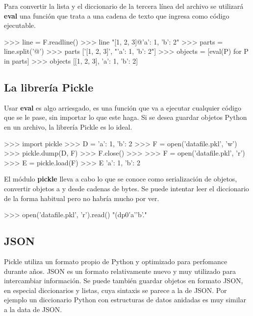 Para convertir la lista y el diccionario de la tercera línea del archivo se utilizará \textbf{eval} una función que trata a una cadena de texto que ingresa como código ejecutable.\\

\begin{pyglist} [language=python]
>>> line = F.readline()
>>> line
"[1, 2, 3]@{'a': 1, 'b': 2}\n"
>>> parts = line.split('@')
>>> parts
['[1, 2, 3]', "{'a': 1, 'b': 2}\n"]
>>> objects = [eval(P) for P in parts]
>>> objects
[[1, 2, 3], {'a': 1, 'b': 2}]
\end{pyglist}

\subsection{La librería Pickle}

Usar \textbf{eval} es algo arriesgado, es una función que va a ejecutar cualquier código que se le pase, sin importar lo que este haga. Si se desea guardar objetos Python en un archivo, la librería Pickle es lo ideal.\\

\begin{pyglist} [language=python]
>>> import pickle
>>> D = {'a': 1, 'b': 2}
>>> F = open('datafile.pkl', 'w')
>>> pickle.dump(D, F)
>>> F.close()
>>> 
>>> F = open('datafile.pkl', 'r')
>>> E = pickle.load(F)
>>> E
{'a': 1, 'b': 2}
\end{pyglist}

El módulo \textbf{pickle} lleva a cabo lo que se conoce como serialización de objetos, convertir objetos a y desde cadenas de bytes. Se puede intentar leer el diccionario de la forma habitual pero no habría mucho por ver.\\

\begin{pyglist} [language=python]
>>> open('datafile.pkl', 'r').read()
"(dp0\nS'a'\nsS'b'\ns."
\end{pyglist}

\subsection{JSON}

Pickle utiliza un formato propio de Python y optimizado para perfomance durante años. JSON es un formato relativamente nuevo y muy utilizado para intercambiar información. Se puede también guardar objetos en formato JSON, en especial diccionarios y listas, cuya sintaxis se parece a la de JSON. Por ejemplo un diccionario Python con estructuras de datos anidadas es muy similar a la data de JSON.\\

